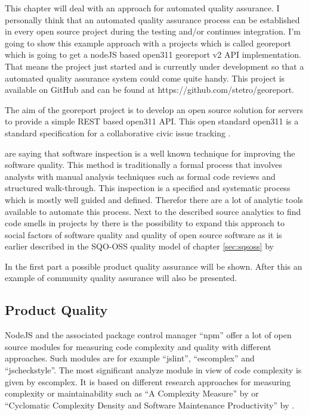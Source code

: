 \documentclass[DIV=calc,paper=a4,fontsize=9pt,twocolumn]{scrartcl}
\begin{document}
This chapter will deal with an approach for automated quality assurance. I personally think that an automated quality assurance process can be established in every open source project during the testing and/or continues integration. I'm going to show this example approach with a projects which is called georeport which is going to get a nodeJS based open311 georeport v2 API implementation. That means the project just started and is currently under development so that a automated quality assurance system could come quite handy. This project is available on GitHub and can be found at https://github.com/stetro/georeport.

The aim of the georeport project is to develop an open source solution for servers to provide a simple REST based open311 API. This open standard open311 is a standard specification for a collaborative civic issue tracking \citep{open311}.

\citet{van2002java} are saying that software inspection is a well known technique for improving the software quality. This method is traditionally a formal process that involves analysts with manual analysis techniques such as formal code reviews and structured walk-through. This inspection is a specified and systematic process which is mostly well guided and defined. Therefor there are a lot of analytic tools available to automate this process. Next to the described source analytics to find code smells in projects by \citet{van2002java} there is the possibility to expand this approach to social factors of software quality and quality of open source software as it is earlier described in the SQO-OSS quality model of chapter \ref{sec:sqsoss} by \citet{samoladas2008sqo}

In the first part a possible product quality assurance will be shown. After this an example of community quality assurance will also be presented.

\subsection{Product Quality}

NodeJS and the associated package control manager \enquote{npm} offer a lot of open source modules for measuring code complexity and quality with different approaches. Such modules are for example \enquote{jslint}, \enquote{escomplex} and \enquote{jscheckstyle}. The most significant analyze module in view of code complexity is given by escomplex. It is based on different research approaches for measuring complexity or maintainability such as \enquote{A Complexity Measure} by \citet{mccabe1976complexity} or \enquote{Cyclomatic Complexity Density and Software Maintenance Productivity} by \citet{gill1991cyclomatic}.
\end{document}
